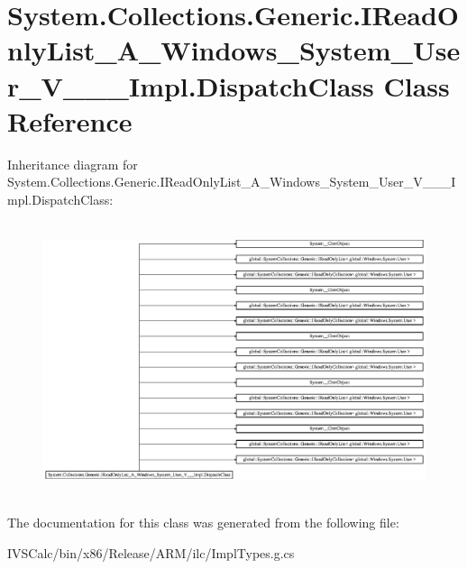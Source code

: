 \hypertarget{class_system_1_1_collections_1_1_generic_1_1_i_read_only_list___a___windows___system___user___v_______impl_1_1_dispatch_class}{}\section{System.\+Collections.\+Generic.\+I\+Read\+Only\+List\+\_\+\+A\+\_\+\+Windows\+\_\+\+System\+\_\+\+User\+\_\+\+V\+\_\+\+\_\+\+\_\+\+Impl.\+Dispatch\+Class Class Reference}
\label{class_system_1_1_collections_1_1_generic_1_1_i_read_only_list___a___windows___system___user___v_______impl_1_1_dispatch_class}
Inheritance diagram for System.\+Collections.\+Generic.\+I\+Read\+Only\+List\+\_\+\+A\+\_\+\+Windows\+\_\+\+System\+\_\+\+User\+\_\+\+V\+\_\+\+\_\+\+\_\+\+Impl.\+Dispatch\+Class\+:\begin{figure}[H]
\begin{center}
\leavevmode
\includegraphics[height=8.101266cm]{class_system_1_1_collections_1_1_generic_1_1_i_read_only_list___a___windows___system___user___v_______impl_1_1_dispatch_class}
\end{center}
\end{figure}


The documentation for this class was generated from the following file\+:\begin{DoxyCompactItemize}
\item 
I\+V\+S\+Calc/bin/x86/\+Release/\+A\+R\+M/ilc/Impl\+Types.\+g.\+cs\end{DoxyCompactItemize}
